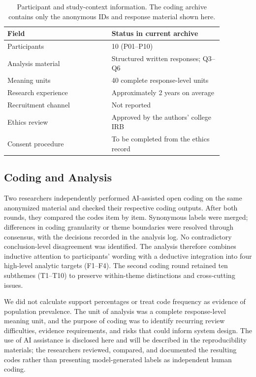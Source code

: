 \begin{table}[t]
  \centering
  \caption{Participant and study-context information. The coding archive contains only the anonymous IDs and response material shown here.}
  \label{tab:formative-participants}
  \begin{tabular}{p{0.42\linewidth}p{0.45\linewidth}}
    \toprule
    Field & Status in current archive\\
    \midrule
    Participants & 10 (P01--P10)\\
    Analysis material & Structured written responses; Q3--Q6\\
    Meaning units & 40 complete response-level units\\
    Research experience & Approximately 2 years on average\\
    Recruitment channel & Not reported\\
    Ethics review & Approved by the authors' college IRB\\
    Consent procedure & To be completed from the ethics record\\
    \bottomrule
  \end{tabular}
\end{table}

\subsection{Coding and Analysis}
\label{sec:formative-analysis}

Two researchers independently performed AI-assisted open coding on the same
anonymized material and checked their respective coding outputs. After both
rounds, they compared the codes item by item. Synonymous labels were merged;
differences in coding granularity or theme boundaries were resolved through
consensus, with the decisions recorded in the analysis log. No contradictory
conclusion-level disagreement was identified. The analysis therefore combines
inductive attention to participants' wording with a deductive integration into
four high-level analytic targets (F1--F4). The second coding round retained ten
subthemes (T1--T10) to preserve within-theme distinctions and cross-cutting
issues.

We did not calculate support percentages or treat code frequency as evidence of
population prevalence. The unit of analysis was a complete response-level
meaning unit, and the purpose of coding was to identify recurring review
difficulties, evidence requirements, and risks that could inform system design.
The use of AI assistance is disclosed here and will be described in the
reproducibility materials; the researchers reviewed, compared, and documented
the resulting codes rather than presenting model-generated labels as
independent human coding.

